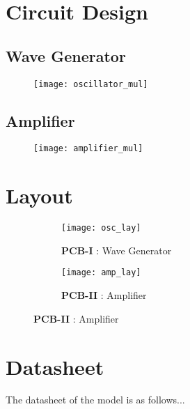 \appendix
\section{Circuit Design}
\subsection*{Wave Generator}
\begin{figure}[h]
    \centering
    \texttt{[image: oscillator\_mul]}
    \vspace*{-5cm}
\end{figure}
\subsection*{Amplifier}
\begin{figure}
    \centering
    \vspace*{-6.5cm}
    \texttt{[image: amplifier\_mul]}
\end{figure}
\newpage

\section{Layout}
\begin{figure}[h]
    
    \begin{subfigure}{\textwidth}
        \centering
        \texttt{[image: osc\_lay]}
        \caption{\textbf{PCB-I} : Wave Generator}
    \end{subfigure}
    \vspace*{.5cm}
    \begin{subfigure}{\textwidth}
        \centering
        \texttt{[image: amp\_lay]}
        \caption{\textbf{PCB-II} : Amplifier}
    \end{subfigure}
\end{figure}
\section{Datasheet}
The datasheet of the model is as follows...
